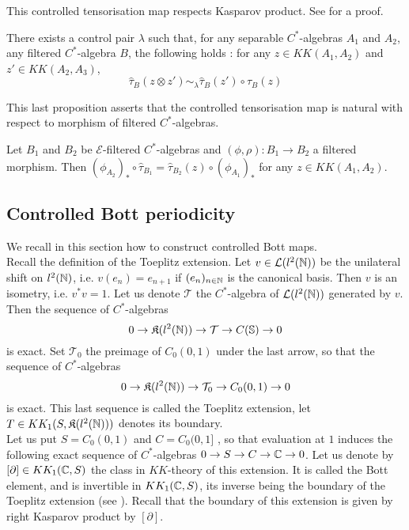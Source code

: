 This controlled tensorisation map respects Kasparov product. See \cite{OY2} for a proof.

\begin{thm}
There exists a control pair $\lambda$ such that, for any separable $C^*$-algebras $A_1$ and $A_2$, any filtered $C^*$-algebra $B$, the following holds : for any $z\in KK(A_1,A_2)$ and $z'\in KK(A_2,A_3)$,
\[\hat\tau_B(z\otimes z')\sim_\lambda \hat\tau_B(z')\circ\hat\tau_B(z)\]
\end{thm}

This last proposition asserts that the controlled tensorisation map is natural with respect to morphism of filtered $C^*$-algebras. \cite{OY2}

\begin{prop}
Let $B_1$ and $B_2$ be $\mathcal E$-filtered $C^*$-algebras and $(\phi,\rho) :B_1\rightarrow B_2 $ a filtered morphism. Then $ (\phi_{A_2})_*\circ \hat \tau_{B_1}=\hat \tau_{B_2}(z)\circ(\phi_{A_1})_* $ for any $z\in KK(A_1,A_2)$.
\end{prop}

\subsection{Controlled Bott periodicity}

We recall in this section how to construct controlled Bott maps. \\

Recall the definition of the Toeplitz extension. Let $v\in \mathcal L(l^2(\mathbb N))$ be the unilateral shift on $l^2(\mathbb N)$, i.e. $v(e_n) = e_{n+1}$ if $(e_n)_{n\in \mathbb N}$ is the canonical basis. Then $v$ is an isometry, i.e. $v^*v = 1$. Let us denote $\mathcal T $ the $C^*$-algebra of $\mathcal L(l^2(\mathbb N))$ generated by $v$. Then the sequence of $C^*$-algebras 
\[0\rightarrow \mathfrak K(l^2(\mathbb N)) \rightarrow \mathcal T \rightarrow C(\mathbb S) \rightarrow 0 \]
is exact. Set $\mathcal T_0$ the preimage of $C_0(0,1)$ under the last arrow, so that the sequence of $C^*$-algebras
\[0\rightarrow \mathfrak K(l^2(\mathbb N)) \rightarrow \mathcal T_0 \rightarrow C_0(0,1) \rightarrow 0 \]
is exact. This last sequence is called the Toeplitz extension, let $T\in KK_1(S, \mathfrak K(l^2(\mathbb N)) )$ denotes its boundary.\\

Let us put $S = C_0(0,1)$ and $C= C_0(0,1]$ , so that evaluation at $1$ induces the following exact sequence of $C^*$-algebras $0\rightarrow S \rightarrow C \rightarrow \mathbb C \rightarrow  0 $. Let us denote by $[\partial]\in KK_1(\mathbb C,S)$ the class in $KK$-theory of this extension. It is called the Bott element, and is invertible in $KK_1(\mathbb C,S)$, its inverse being the boundary of the Toeplitz extension (see \cite{OY2}). Recall that the boundary of this extension is given by right Kasparov product by $[\partial]$.\\ 

